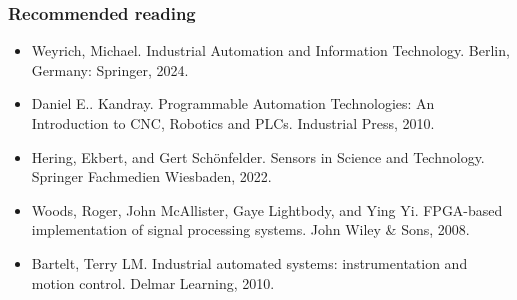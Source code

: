 
\begin{frame}
	\frametitle{Recommended reading}
	\begin{itemize}
		\item Weyrich, Michael. Industrial Automation and Information Technology. Berlin, Germany: Springer, 2024.
		\item Daniel E.. Kandray. Programmable Automation Technologies: An Introduction to CNC, Robotics and PLCs. Industrial Press, 2010.
		\item Hering, Ekbert, and Gert Schönfelder. Sensors in Science and Technology. Springer Fachmedien Wiesbaden, 2022.
		\item Woods, Roger, John McAllister, Gaye Lightbody, and Ying Yi. FPGA-based implementation of signal processing systems. John Wiley \& Sons, 2008.
		\item Bartelt, Terry LM. Industrial automated systems: instrumentation and motion control. Delmar Learning, 2010.
	\end{itemize}
\end{frame}